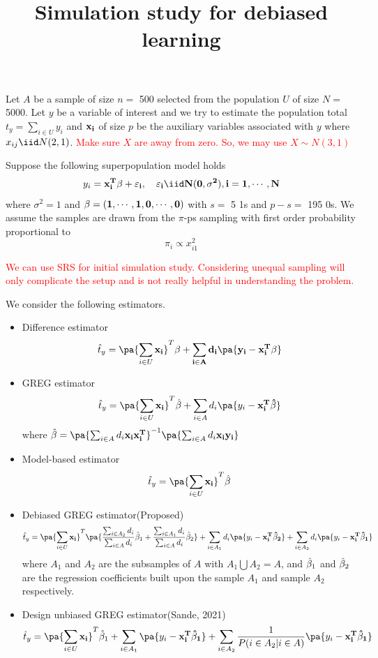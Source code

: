 \documentclass[
]{article}
\title{Simulation study for debiased learning}
\author{}
\date{\vspace{-2.5em}}
\begin{document}
\maketitle

Let \(A\) be a sample of size \(n =\) 500 selected from the population
\(U\) of size \(N =\) 5000. Let \(y\) be a variable of interest and we
try to estimate the population total \(t_y = \sum_{i \in U} y_i\) and
\(\bf x_{i}\) of size \(p\) be the auxiliary variables associated with
\(y\) where \(x_{ij} \iid N(2, 1)\).
\textcolor{red}{Make sure $X$ are away from zero. So, we may use $X \sim N(3,1)$ }

Suppose the following
superpopulation model holds \[
y_i = \bf x_i^T \bf \beta + \varepsilon_i, \quad \varepsilon_i \iid N(0,\sigma^2), i = 1, \cdots, N
\] where \(\sigma^2 = 1\) and
\(\bf \beta = (1, \cdots, 1, 0, \cdots, 0)\) with \(s =\) 5 1s and
\(p - s =\) 195 0s. We assume the samples are drawn from the \(\pi\)-ps
sampling with first order probability proportional to \[
\pi_i \propto x_{i1}^2
\]

\textcolor{red}{We can use SRS for initial simulation study. Considering unequal sampling will only complicate the setup and is not really helpful in understanding the problem. 
}

We consider the following estimators.

\begin{itemize}
  \item Difference estimator
  $$
  \hat t_y = \pa{\sum_{i \in U}\bf x_i}^T \bf \beta + \sum_{i \in A} d_i \pa{y_i - \bf x_i^T \bf \beta}
  $$
  \item GREG estimator
  $$
  \hat t_y = \pa{\sum_{i \in U}\bf x_i}^T \hat{\bf \beta} + \sum_{i \in A} d_i \pa{y_i - \bf x_i^T \hat{\bf \beta}}
  $$
  where $\hat {\bf \beta} = \pa{\sum_{i \in A} d_i \bf x_i \bf x_i^T}^{-1} \pa{\sum_{i \in A} d_i \bf x_i y_i}$
  
  \item Model-based estimator
  $$
  \hat t_y = \pa{\sum_{i \in U}\bf x_i}^T \hat{\bf \beta}
  $$
  
  \item Debiased GREG estimator(Proposed)
    $$
  \hat t_y = \pa{\sum_{i \in U}\bf x_i}^T \pa{ \frac{\sum_{i \in A_2}d_i}{\sum_{i \in A}d_i} \hat{\bf \beta}_1 + \frac{\sum_{i \in A_1}d_i}{\sum_{i \in A}d_i} \hat{\bf \beta}_2} + \sum_{i \in A_1} d_i \pa{y_i - \bf x_i^T \hat{\bf \beta}_2} + \sum_{i \in A_2} d_i \pa{y_i - \bf x_i^T \hat{\bf \beta}_1}
  $$
  where $A_1$ and $A_2$ are the subsamples of $A$ with $A_1 \bigcup A_2 = A$, and $\hat {\bf \beta}_1$ and $\hat {\bf \beta}_2$ are the regression coefficients built upon the sample $A_1$ and sample $A_2$ respectively.
  \item Design unbiased GREG estimator(Sande, 2021)
  $$
  \hat t_y = \pa{\sum_{i \in U}\bf x_i}^T \hat{\bf \beta}_1 + \sum_{i \in A_1} \pa{y_i - \bf x_i^T \hat{\bf \beta}_1} + \sum_{i \in A_2} \frac{1}{P(i \in A_2 | i \in A)} \pa{y_i - \bf x_i^T \hat{\bf \beta}_1}
  $$
  
\end{itemize}
\end{document}
